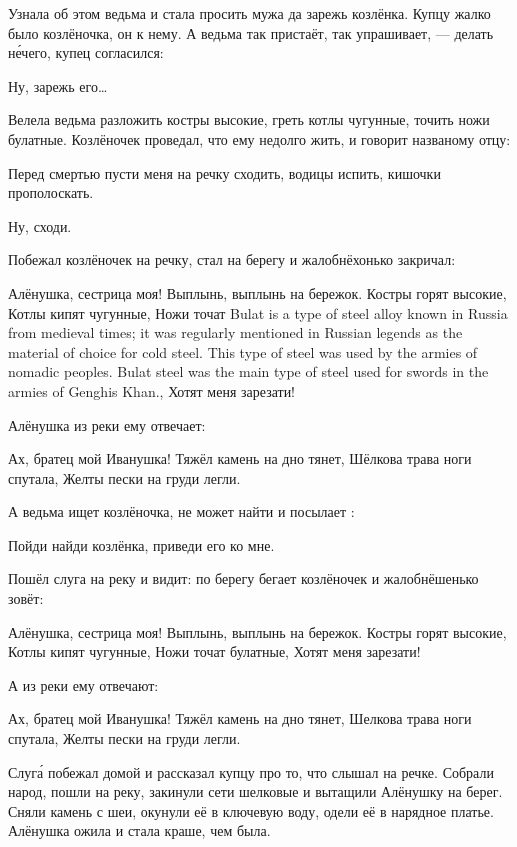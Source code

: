 Узнала об этом ведьма и стала просить мужа  да зарежь козлёнка.
Купцу жалко было козлёночка,  он к нему. А ведьма так пристаёт, так упрашивает, --- делать н\'{е}чего, купец согласился:
%
\begin{dialogue}
    \item Ну, зарежь его\dots
\end{dialogue}
%
Велела ведьма разложить костры высокие, греть котлы чугунные, точить ножи булатные.
Козлёночек проведал, что ему недолго жить, и говорит названому отцу:
%
\begin{dialogue}
    \item Перед смертью пусти меня на речку сходить, водицы испить, кишочки прополоскать.
    \item Ну, сходи.
\end{dialogue}
%
Побежал козлёночек на речку, стал на берегу и жалобнёхонько закричал:
%
\begin{dialogue}
    \item   Алёнушка, сестрица моя! Выплынь, выплынь на бережок.
    Костры горят высокие,
    Котлы кипят чугунные,
    Ножи точат  {Bulat is a type of steel alloy known in Russia from medieval times; it was regularly mentioned in Russian legends as the material of choice for cold steel. This type of steel was used by the armies of nomadic peoples. Bulat steel was the main type of steel used for swords in the armies of Genghis Khan.},
    Хотят меня зарезати!
\end{dialogue}
%
%
Алёнушка из реки ему отвечает:
%
\begin{dialogue}
    \item Ах, братец мой Иванушка! Тяжёл камень на дно тянет,
    Шёлкова трава ноги спутала,
    Желты пески на груди легли.
\end{dialogue}
%
%
А ведьма ищет козлёночка, не может найти и посылает :
\begin{dialogue}
    \item Пойди найди козлёнка, приведи его ко мне.
\end{dialogue}
% 
%
Пошёл слуга на реку и видит: по берегу бегает козлёночек и жалобнёшенько зовёт:
\begin{dialogue}
    \item Алёнушка, сестрица моя! Выплынь, выплынь на бережок.
    Костры горят высокие,
    Котлы кипят чугунные,
    Ножи точат булатные,
    Хотят меня зарезати!
\end{dialogue}
%
%
А из реки ему отвечают:
\begin{dialogue}
    \item Ах, братец мой Иванушка!
    Тяжёл камень на дно тянет,
    Шелкова трава ноги спутала,
    Желты пески на груди легли.
\end{dialogue}
%
Слуг\'{а} побежал домой и рассказал купцу про то, что слышал на речке. Собрали народ, пошли на реку, закинули сети шелковые и вытащили Алёнушку на берег. Сняли камень с шеи, окунули её в ключевую воду, одели её в нарядное платье. Алёнушка ожила и стала краше, чем была.

